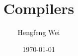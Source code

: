 \documentclass[]{beamer}
\title[]{Compilers}
\subtitle{}
\author[Hengfeng Wei]{\large Hengfeng Wei}
\institute{hfwei@nju.edu.cn}
\date{\today}
\begin{document}
\maketitle


\thankyou{}

\end{document}

